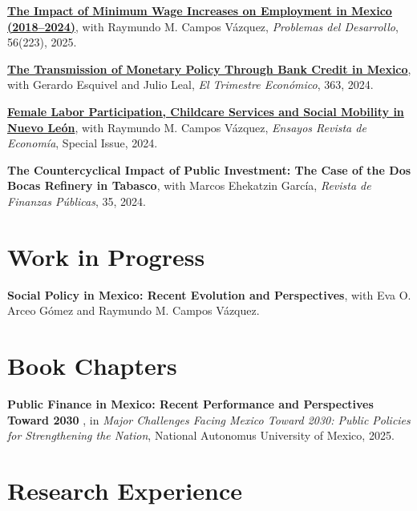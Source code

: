 \documentclass[11pt]{article}
\begin{document}
\vspace{4pt}

\href{https://doi.org/10.22201/iiec.20078951e.2025.223.70415}{\textbf{The Impact of Minimum Wage Increases on Employment in Mexico (2018–2024)}},
with Raymundo M. Campos Vázquez,  
\textit{Problemas del Desarrollo}, 56(223), 2025.

\vspace{4pt}

\href{https://doi.org/10.20430/ete.v91i363.2230}{\textbf{The Transmission of Monetary Policy Through Bank Credit in Mexico}},  
with Gerardo Esquivel and Julio Leal,  
\textit{El Trimestre Económico}, 363, 2024.

\vspace{4pt}

\href{https://doi.org/10.29105/ensayos_esp1.1-1}{\textbf{Female Labor Participation, Childcare Services and Social Mobility in Nuevo León}},  
with Raymundo M. Campos Vázquez,  
\textit{Ensayos Revista de Economía}, Special Issue, 2024.

\vspace{4pt}

\textbf{The Countercyclical Impact of Public Investment: The Case of the Dos Bocas Refinery in Tabasco},  
with Marcos Ehekatzin García,  
\textit{Revista de Finanzas Públicas}, 35, 2024.


\section*{Work in Progress}

\textbf{Social Policy in Mexico: Recent Evolution and Perspectives},  
with Eva O. Arceo Gómez and Raymundo M. Campos Vázquez.


\section*{Book Chapters}
\textbf{Public Finance in Mexico: Recent Performance and Perspectives Toward 2030
}, in \textit{Major Challenges Facing Mexico Toward 2030: Public Policies for Strengthening the Nation}, National Autonomus University of Mexico, 2025.


\section*{Research Experience}
\end{document}
